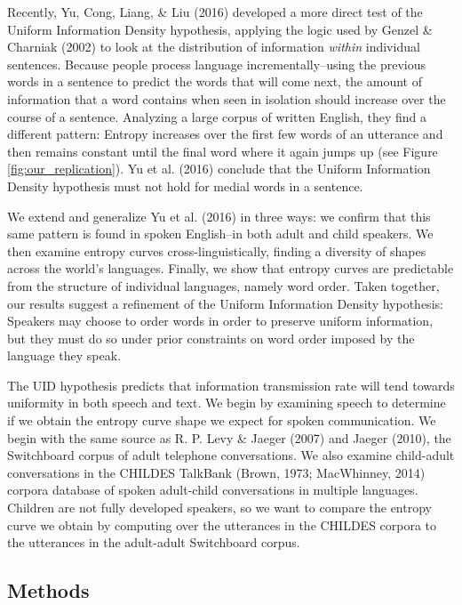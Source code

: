 \documentclass[10pt, letterpaper]{article}
\begin{document}
Recently, Yu, Cong, Liang, \& Liu (2016) developed a more direct test of
the Uniform Information Density hypothesis, applying the logic used by
Genzel \& Charniak (2002) to look at the distribution of information
\emph{within} individual sentences. Because people process language
incrementally--using the previous words in a sentence to predict the
words that will come next, the amount of information that a word
contains when seen in isolation should increase over the course of a
sentence. Analyzing a large corpus of written English, they find a
different pattern: Entropy increases over the first few words of an
utterance and then remains constant until the final word where it again
jumps up (see Figure \ref{fig:our_replication}). Yu et al. (2016)
conclude that the Uniform Information Density hypothesis must not hold
for medial words in a sentence.

We extend and generalize Yu et al. (2016) in three ways: we confirm that
this same pattern is found in spoken English--in both adult and child
speakers. We then examine entropy curves cross-linguistically, finding a
diversity of shapes across the world's languages. Finally, we show that
entropy curves are predictable from the structure of individual
languages, namely word order. Taken together, our results suggest a
refinement of the Uniform Information Density hypothesis: Speakers may
choose to order words in order to preserve uniform information, but they
must do so under prior constraints on word order imposed by the language
they speak.

The UID hypothesis predicts that information transmission rate will tend
towards uniformity in both speech and text. We begin by examining speech
to determine if we obtain the entropy curve shape we expect for spoken
communication. We begin with the same source as R. P. Levy \& Jaeger
(2007) and Jaeger (2010), the Switchboard corpus of adult telephone
conversations. We also examine child-adult conversations in the CHILDES
TalkBank (Brown, 1973; MacWhinney, 2014) corpora database of spoken
adult-child conversations in multiple languages. Children are not fully
developed speakers, so we want to compare the entropy curve we obtain by
computing over the utterances in the CHILDES corpora to the utterances
in the adult-adult Switchboard corpus.

\subsection{Methods}\label{methods}
\end{document}
